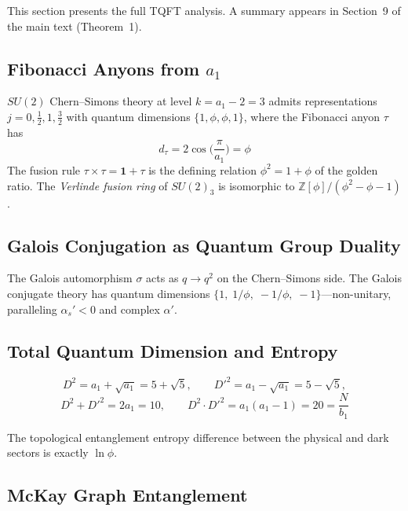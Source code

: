 \documentclass[12pt,a4paper]{article}
\theoremstyle{definition}
\begin{document}
This section presents the full TQFT analysis.  A summary appears in Section~9 of the main text (Theorem~1).

\subsection{Fibonacci Anyons from \texorpdfstring{$a_1$}{a1}}

$SU(2)$ Chern--Simons theory at level $k = a_1 - 2 = 3$ admits representations $j = 0, \tfrac12, 1, \tfrac32$ with quantum dimensions $\{1, \phi, \phi, 1\}$, where the Fibonacci anyon $\tau$ has
\begin{equation}
d_\tau = 2\cos\!\Big(\frac{\pi}{a_1}\Big) = \phi
\end{equation}
The fusion rule $\tau \times \tau = \mathbf{1} + \tau$ is the defining relation $\phi^2 = 1 + \phi$ of the golden ratio.  The \emph{Verlinde fusion ring} of $SU(2)_3$ is isomorphic to $\mathbb{Z}[\phi]/(\phi^2 - \phi - 1)$.

\subsection{Galois Conjugation as Quantum Group Duality}

The Galois automorphism $\sigma$ acts as $q \to q^2$ on the Chern--Simons side.  The Galois conjugate theory has quantum dimensions $\{1,\; 1/\phi,\; -1/\phi,\; -1\}$---non-unitary, paralleling $\alpha_s' < 0$ and complex $\alpha'$.

\subsection{Total Quantum Dimension and Entropy}

\begin{equation}
D^2 = a_1 + \sqrt{a_1} = 5 + \sqrt{5}, \qquad D'^2 = a_1 - \sqrt{a_1} = 5 - \sqrt{5},
\end{equation}
\begin{equation}
D^2 + D'^2 = 2a_1 = 10, \qquad D^2 \cdot D'^2 = a_1(a_1 - 1) = 20 = \frac{N}{b_1}
\end{equation}

The topological entanglement entropy difference between the physical and dark sectors is exactly $\ln\phi$.

\subsection{McKay Graph Entanglement}
\end{document}
